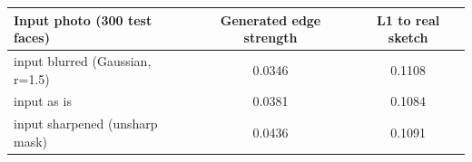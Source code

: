 \begin{tabular}{lcc}
\toprule
Input photo (300 test faces) & Generated edge strength & L1 to real sketch \\
\midrule
input blurred (Gaussian, r=1.5) & 0.0346 & 0.1108 \\
input as is & 0.0381 & 0.1084 \\
input sharpened (unsharp mask) & 0.0436 & 0.1091 \\
\bottomrule
\end{tabular}
